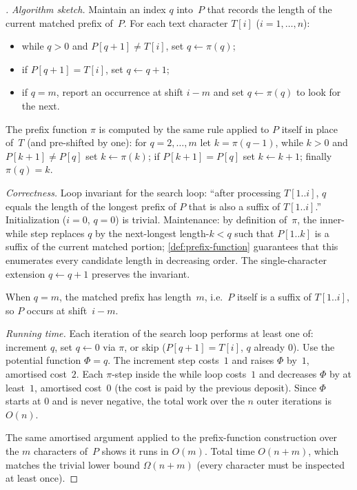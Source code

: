 \begin{proof}[]
\emph{Algorithm sketch.} Maintain an index $q$ into~$P$ that records
the length of the current matched prefix of~$P$. For each text
character $T[i]$ ($i = 1, \dots, n$):
\begin{itemize}
  \item while $q > 0$ and $P[q + 1] \neq T[i]$, set $q \leftarrow \pi(q)$;
  \item if $P[q + 1] = T[i]$, set $q \leftarrow q + 1$;
  \item if $q = m$, report an occurrence at shift $i - m$ and set
        $q \leftarrow \pi(q)$ to look for the next.
\end{itemize}
The prefix function $\pi$ is computed by the same rule applied to $P$
itself in place of~$T$ (and pre-shifted by one): for $q = 2, \dots, m$
let $k = \pi(q - 1)$, while $k > 0$ and $P[k + 1] \neq P[q]$ set
$k \leftarrow \pi(k)$; if $P[k + 1] = P[q]$ set $k \leftarrow k + 1$;
finally $\pi(q) = k$.

\emph{Correctness.} Loop invariant for the search loop: ``after
processing $T[1..i]$, $q$ equals the length of the longest prefix of
$P$ that is also a suffix of $T[1..i]$.'' Initialization ($i = 0$,
$q = 0$) is trivial. Maintenance: by definition of~$\pi$, the
inner-while step replaces $q$ by the next-longest length-$k < q$
such that $P[1..k]$ is a suffix of the current matched portion;
\cref{def:prefix-function} guarantees that this enumerates every
candidate length in decreasing order. The single-character extension
$q \leftarrow q + 1$ preserves the invariant.

When $q = m$, the matched prefix has length~$m$, i.e.\ $P$ itself is
a suffix of $T[1..i]$, so $P$ occurs at shift~$i - m$.

\emph{Running time.} Each iteration of the search loop performs at
least one of: increment $q$, set $q \leftarrow 0$ via $\pi$, or skip
($P[q + 1] = T[i]$, $q$ already 0). Use the potential function
$\Phi = q$. The increment step costs~$1$ and raises $\Phi$ by~$1$,
amortised cost~$2$. Each $\pi$-step inside the while loop costs~$1$
and decreases $\Phi$ by at least~$1$, amortised cost~$0$ (the cost is
paid by the previous deposit). Since $\Phi$ starts at $0$ and is
never negative, the total work over the $n$ outer iterations is
$O(n)$.

The same amortised argument applied to the prefix-function
construction over the $m$ characters of~$P$ shows it runs in $O(m)$.
Total time $O(n + m)$, which matches the trivial lower bound
$\Omega(n + m)$ (every character must be inspected at least once).
\end{proof}

